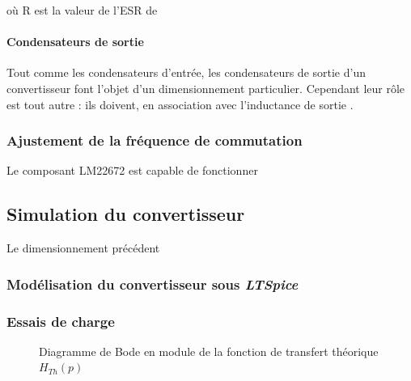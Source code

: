 \documentclass[a4paper,12pt]{book}
\begin{document}
						où R est la valeur de l'ESR de
						
								
							\paragraph{Condensateurs de sortie}
							
							Tout comme les condensateurs d'entrée, les condensateurs de sortie d'un convertisseur font l'objet d'un dimensionnement particulier. Cependant leur rôle est tout autre : ils doivent, en association avec l'inductance de sortie \cite{A055}.	
				
				
			
			\subsubsection{Ajustement de la fréquence de commutation}
			
			Le composant LM22672 est capable de fonctionner 
			
			\subsection{Simulation du convertisseur}
			
			Le dimensionnement précédent
			
				\subsubsection{Modélisation du convertisseur sous \textit{LTSpice}}
				
				\subsubsection{Essais de charge}
				
				\begin{figure}[h]
\begin{center}
\end{center}
\label{filtre_th}
\caption{Diagramme de Bode en module de la fonction de transfert théorique $H_{Th}(p)$}
\end{figure}
				
\end{document}
